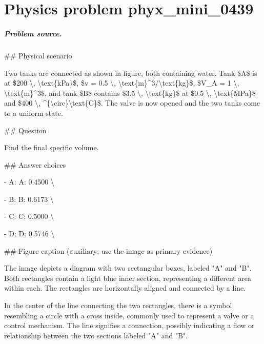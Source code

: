 
\chapter{Physics problem phyx\_mini\_0439}
\label{ch:PhyXMiniProblems_problem_phyx_mini_0439}

\paragraph{Problem source.}
\#\# Physical scenario

Two tanks are connected as shown in figure, both containing water. Tank \$A\$ is at \$200 \textbackslash{}, \textbackslash{}text\{kPa\}\$, \$v = 0.5 \textbackslash{}, \textbackslash{}text\{m\}\textasciicircum{}3/\textbackslash{}text\{kg\}\$, \$V\_A = 1 \textbackslash{}, \textbackslash{}text\{m\}\textasciicircum{}3\$, and tank \$B\$ contains \$3.5 \textbackslash{}, \textbackslash{}text\{kg\}\$ at \$0.5 \textbackslash{}, \textbackslash{}text\{MPa\}\$ and \$400 \textbackslash{}, \textasciicircum{}\{\textbackslash{}circ\}\textbackslash{}text\{C\}\$. The valve is now opened and the two tanks come to a uniform state.

\#\# Question

Find the final specific volume.

\#\# Answer choices

- A: A: 0.4500 \textbackslash{}

- B: B: 0.6173 \textbackslash{}

- C: C: 0.5000 \textbackslash{}

- D: D: 0.5746 \textbackslash{}

\#\# Figure caption (auxiliary; use the image as primary evidence)

The image depicts a diagram with two rectangular boxes, labeled "A" and "B". Both rectangles contain a light blue inner section, representing a different area within each. The rectangles are horizontally aligned and connected by a line. 

In the center of the line connecting the two rectangles, there is a symbol resembling a circle with a cross inside, commonly used to represent a valve or a control mechanism. The line signifies a connection, possibly indicating a flow or relationship between the two sections labeled "A" and "B".


